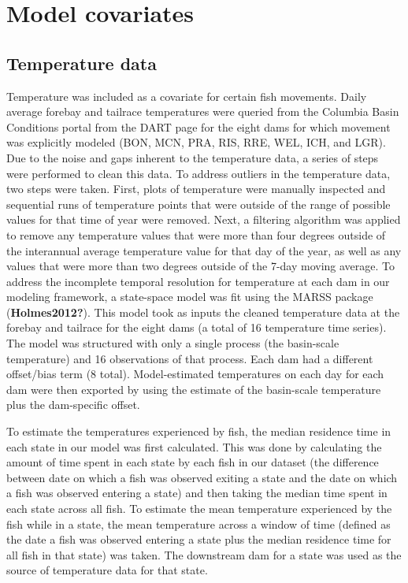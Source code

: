 \documentclass[
  12pt,
]{report}
\begin{document}
\hypertarget{model-covariates}{%
\section{Model covariates}\label{model-covariates}}

\hypertarget{temperature-data}{%
\subsection{Temperature data}\label{temperature-data}}

Temperature was included as a covariate for certain fish movements.
Daily average forebay and tailrace temperatures were queried from the
Columbia Basin Conditions portal from the DART page for the eight dams
for which movement was explicitly modeled (BON, MCN, PRA, RIS, RRE, WEL,
ICH, and LGR). Due to the noise and gaps inherent to the temperature
data, a series of steps were performed to clean this data. To address
outliers in the temperature data, two steps were taken. First, plots of
temperature were manually inspected and sequential runs of temperature
points that were outside of the range of possible values for that time
of year were removed. Next, a filtering algorithm was applied to remove
any temperature values that were more than four degrees outside of the
interannual average temperature value for that day of the year, as well
as any values that were more than two degrees outside of the 7-day
moving average. To address the incomplete temporal resolution for
temperature at each dam in our modeling framework, a state-space model
was fit using the MARSS package (\textbf{Holmes2012?}). This model took
as inputs the cleaned temperature data at the forebay and tailrace for
the eight dams (a total of 16 temperature time series). The model was
structured with only a single process (the basin-scale temperature) and
16 observations of that process. Each dam had a different offset/bias
term (8 total). Model-estimated temperatures on each day for each dam
were then exported by using the estimate of the basin-scale temperature
plus the dam-specific offset.

To estimate the temperatures experienced by fish, the median residence
time in each state in our model was first calculated. This was done by
calculating the amount of time spent in each state by each fish in our
dataset (the difference between date on which a fish was observed
exiting a state and the date on which a fish was observed entering a
state) and then taking the median time spent in each state across all
fish. To estimate the mean temperature experienced by the fish while in
a state, the mean temperature across a window of time (defined as the
date a fish was observed entering a state plus the median residence time
for all fish in that state) was taken. The downstream dam for a state
was used as the source of temperature data for that state.
\end{document}
